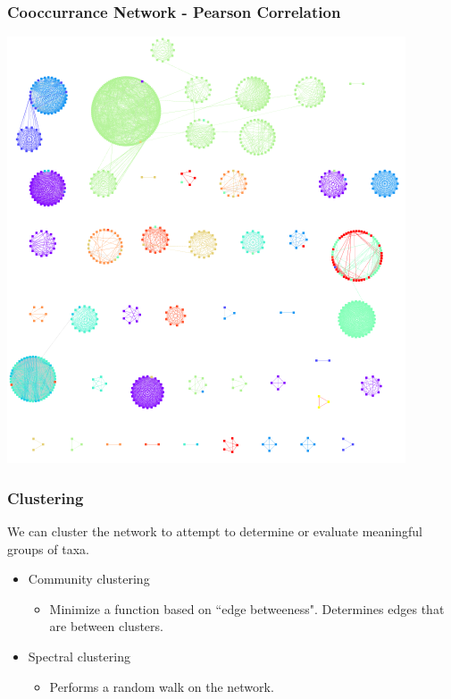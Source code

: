 \documentclass{beamer}
\begin{document}
\begin{frame}
\frametitle{Cooccurrance Network - Pearson Correlation}
\begin{center}
\includegraphics[scale = 0.4]{../pearson_species.png}
\end{center}
\end{frame}
\begin{frame}
\frametitle{Clustering}
We can cluster the network to attempt to determine or evaluate meaningful groups of taxa.
\begin{itemize}
	\item Community clustering
	\begin{itemize}\item Minimize a function based on ``edge betweeness". Determines edges that are between clusters.\end{itemize}
	\item Spectral clustering
	\begin{itemize}
		\item Performs a random walk on the network.
	\end{itemize} 
\end{itemize}
\end{frame}
\end{document}
